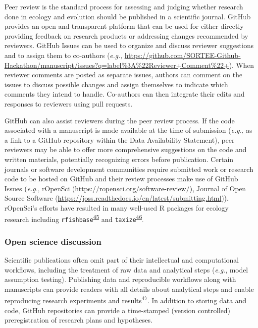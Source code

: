 Peer review is the standard process for assessing and judging whether research done in ecology and evolution should be published in a scientific journal.
GitHub provides an open and transparent platform that can be used for either directly providing feedback on research products or addressing changes recommended by reviewers.
GitHub Issues can be used to organize and discuss reviewer suggestions and to assign them to co-authors (\emph{e.g.}, \url{https://github.com/SORTEE-Github-Hackathon/manuscript/issues?q=label\%3A\%22Reviewer+Comment\%22+}).
When reviewer comments are posted as separate issues, authors can comment on the issues to discuss possible changes and assign themselves to indicate which comments they intend to handle.
Co-authors can then integrate their edits and responses to reviewers using pull requests.

GitHub can also assist reviewers during the peer review process.
If the code associated with a manuscript is made available at the time of submission (\emph{e.g.}, as a link to a GitHub repository within the Data Availability Statement), peer reviewers may be able to offer more comprehensive suggestions on the code and written materials, potentially recognizing errors before publication.
Certain journals or software development communities require submitted work or research code to be hosted on GitHub and their review processes make use of GitHub Issues (\emph{e.g.}, rOpenSci (\url{https://ropensci.org/software-review/}), Journal of Open Source Software (\url{https://joss.readthedocs.io/en/latest/submitting.html})).
rOpenSci's efforts have resulted in many well-used R packages for ecology research including \texttt{rfishbase}\textsuperscript{\protect\hyperlink{ref-Xsdcv6q}{45}} and \texttt{taxize}\textsuperscript{\protect\hyperlink{ref-FVBWKkZu}{46}}.

\hypertarget{open-science-discussion}{%
\subsubsection{Open science discussion}\label{open-science-discussion}}

Scientific publications often omit part of their intellectual and computational workflows, including the treatment of raw data and analytical steps (\emph{e.g.}, model assumption testing).
Publishing data and reproducible workflows along with manuscripts can provide readers with all details about analytical steps and enable reproducing research experiments and results\textsuperscript{\protect\hyperlink{ref-NOgBWVAr}{47}}.
In addition to storing data and code, GitHub repositories can provide a time-stamped (version controlled) preregistration of research plans and hypotheses.

